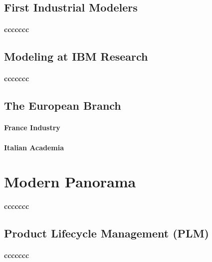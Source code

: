 \subsection{First Industrial Modelers }
\label{subsec:2:style}


\paragraph{ccccccc}




\subsection{Modeling at IBM Research}
\label{subsec:2:style}


\paragraph{ccccccc}



\subsection{The European Branch}
\label{subsec:2:style}


\paragraph{France Industry}


\paragraph{Italian Academia}



\section{Modern Panorama}
\label{sec:3}


\paragraph{ccccccc}



\subsection{Product Lifecycle Management (PLM)}
\label{subsec:2:style}


\paragraph{ccccccc}



